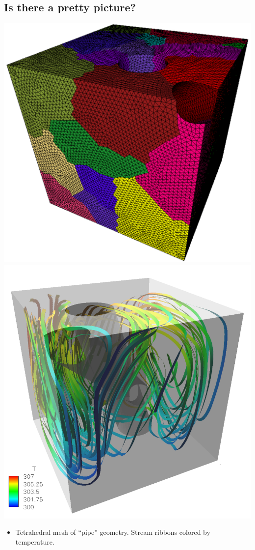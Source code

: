 \subsection*{Is there a pretty picture?}
\begin{frame}[t]
  \begin{center}
    \includegraphics[width=.45\textwidth]{figures/part_trans}
    \includegraphics[width=.45\textwidth]{figures/streamtraces}
  \end{center}
    \begin{itemize}
    \item{
      Tetrahedral mesh of ``pipe'' geometry.
      Stream ribbons colored by temperature.
      }
      \end{itemize}
\end{frame}
